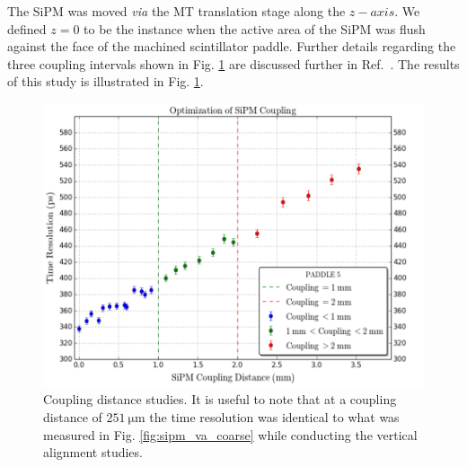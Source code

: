 The SiPM was moved \textit{via} the MT translation stage along the $z-axis$.  We defined $z = 0$ to be the instance when the active area of the SiPM was flush against the face of the machined scintillator paddle.  Further details regarding the three coupling intervals shown in Fig. \ref{fig:sipm_coupling_coarse} are discussed further in Ref.~\cite{pooser16}.  The results of this study is illustrated in Fig. \ref{fig:sipm_coupling_coarse}.
	\begin{figure}[!htb]
		\centering
		\includegraphics[width=0.83\columnwidth]{misalignment/figs/sipm_coupling_coarse}
		\caption{Coupling distance studies.  It is useful to note that at a coupling distance of $\mathrm{251\ \mu m}$ the time resolution was identical to what was measured in Fig. \ref{fig:sipm_va_coarse} while conducting the vertical alignment studies.}
		\label{fig:sipm_coupling_coarse}
	\end{figure}

